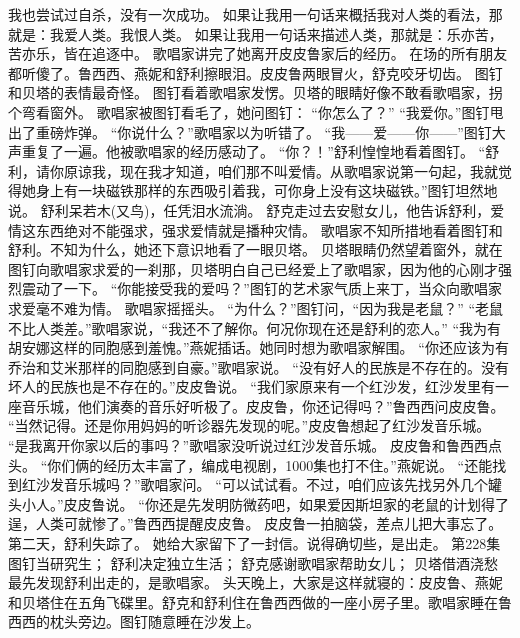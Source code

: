 \documentclass[a4paper,12pt,UTF8,twoside]{ctexbook}
\begin{document}
        我也尝试过自杀，没有一次成功。 
        如果让我用一句话来概括我对人类的看法，那就是：我爱人类。我恨人类。 
        如果让我用一句话来描述人类，那就是：乐亦苦，苦亦乐，皆在追逐中。 
        歌唱家讲完了她离开皮皮鲁家后的经历。 
        在场的所有朋友都听傻了。鲁西西、燕妮和舒利擦眼泪。皮皮鲁两眼冒火，舒克咬牙切齿。 
        图钉和贝塔的表情最奇怪。 
        图钉看着歌唱家发愣。贝塔的眼睛好像不敢看歌唱家，拐个弯看窗外。 
        歌唱家被图钉看毛了，她问图钉： 
        “你怎么了？” 
        “我爱你。”图钉甩出了重磅炸弹。 
        “你说什么？”歌唱家以为听错了。 
        “我——爱——你——”图钉大声重复了一遍。他被歌唱家的经历感动了。 
        “你？！”舒利惶惶地看着图钉。 
        “舒利，请你原谅我，现在我才知道，咱们那不叫爱情。从歌唱家说第一句起，我就觉得她身上有一块磁铁那样的东西吸引着我，可你身上没有这块磁铁。”图钉坦然地说。 
        舒利呆若木(又鸟)，任凭泪水流淌。 
        舒克走过去安慰女儿，他告诉舒利，爱情这东西绝对不能强求，强求爱情就是播种灾情。 
        歌唱家不知所措地看着图钉和舒利。不知为什么，她还下意识地看了一眼贝塔。 
        贝塔眼睛仍然望着窗外，就在图钉向歌唱家求爱的一刹那，贝塔明白自己已经爱上了歌唱家，因为他的心刚才强烈震动了一下。 
        “你能接受我的爱吗？”图钉的艺术家气质上来丁，当众向歌唱家求爱毫不难为情。 
        歌唱家摇摇头。 
        “为什么？”图钉问，“因为我是老鼠？” 
        “老鼠不比人类差。”歌唱家说，“我还不了解你。何况你现在还是舒利的恋人。” 
        “我为有胡安娜这样的同胞感到羞愧。”燕妮插话。她同时想为歌唱家解围。 
        “你还应该为有乔治和艾米那样的同胞感到自豪。”歌唱家说。 
        “没有好人的民族是不存在的。没有坏人的民族也是不存在的。”皮皮鲁说。 
        “我们家原来有一个红沙发，红沙发里有一座音乐城，他们演奏的音乐好听极了。皮皮鲁，你还记得吗？”鲁西西问皮皮鲁。 
        “当然记得。还是你用妈妈的听诊器先发现的呢。”皮皮鲁想起了红沙发音乐城。 
        “是我离开你家以后的事吗？”歌唱家没听说过红沙发音乐城。 
        皮皮鲁和鲁西西点头。 
        “你们俩的经历太丰富了，编成电视剧，1000集也打不住。”燕妮说。 
        “还能找到红沙发音乐城吗？”歌唱家问。 
        “可以试试看。不过，咱们应该先找另外几个罐头小人。”皮皮鲁说。 
        “你还是先发明防微药吧，如果爱因斯坦家的老鼠的计划得了逞，人类可就惨了。”鲁西西提醒皮皮鲁。 
        皮皮鲁一拍脑袋，差点儿把大事忘了。 
        第二天，舒利失踪了。 
        她给大家留下了一封信。说得确切些，是出走。   第228集  
        图钉当研究生；  
        舒利决定独立生活；  
        舒克感谢歌唱家帮助女儿；  
        贝塔借酒浇愁   
        最先发现舒利出走的，是歌唱家。  
        头天晚上，大家是这样就寝的：皮皮鲁、燕妮和贝塔住在五角飞碟里。舒克和舒利住在鲁西西做的一座小房子里。歌唱家睡在鲁西西的枕头旁边。图钉随意睡在沙发上。  
\end{document}
